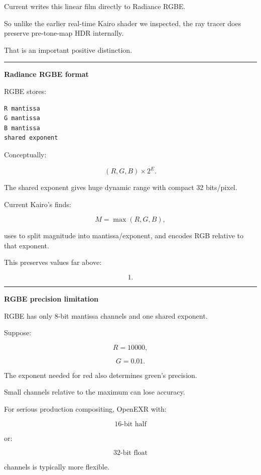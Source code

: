 Current  writes this linear film directly to Radiance RGBE.

So unlike the earlier real-time Kairo shader we inspected, the ray tracer does preserve pre-tone-map HDR internally.

That is an important positive distinction.

\begin{center}\rule{0.5\linewidth}{0.5pt}\end{center}

\textbf{Radiance RGBE format}

RGBE stores:

\begin{verbatim}
R mantissa
G mantissa
B mantissa
shared exponent
\end{verbatim}

Conceptually:

\[
(R,G,B)\times2^E.
\]

The shared exponent gives huge dynamic range with compact 32 bits/pixel.

Current Kairo's  finds:

\[
M=\max(R,G,B),
\]

uses  to split magnitude into mantissa/exponent, and encodes RGB relative to that exponent.

This preserves values far above:

\[
1.
\]

\begin{center}\rule{0.5\linewidth}{0.5pt}\end{center}

\textbf{RGBE precision limitation}

RGBE has only 8-bit mantissa channels and one shared exponent.

Suppose:

\[
R=10000,
\]

\[
G=0.01.
\]

The exponent needed for red also determines green's precision.

Small channels relative to the maximum can lose accuracy.

For serious production compositing, OpenEXR with:

\[
16\text{-bit half}
\]

or:

\[
32\text{-bit float}
\]

channels is typically more flexible.

